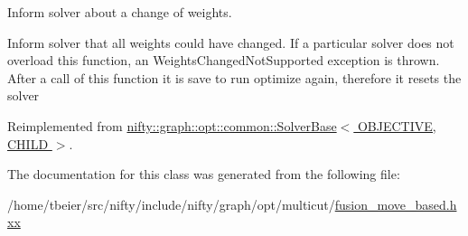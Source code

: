 Inform solver about a change of weights. 

Inform solver that all weights could have changed. If a particular solver does not overload this function, an Weights\+Changed\+Not\+Supported exception is thrown. After a call of this function it is save to run optimize again, therefore it resets the solver 

Reimplemented from \hyperlink{classnifty_1_1graph_1_1opt_1_1common_1_1SolverBase_a6a5d77ee514c4b5f44d1908c1000f0ff}{nifty\+::graph\+::opt\+::common\+::\+Solver\+Base$<$ O\+B\+J\+E\+C\+T\+I\+V\+E, C\+H\+I\+L\+D $>$}.



The documentation for this class was generated from the following file\+:\begin{DoxyCompactItemize}
\item 
/home/tbeier/src/nifty/include/nifty/graph/opt/multicut/\hyperlink{multicut_2fusion__move__based_8hxx}{fusion\+\_\+move\+\_\+based.\+hxx}\end{DoxyCompactItemize}

